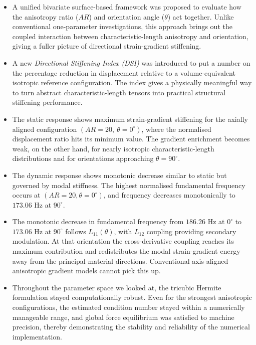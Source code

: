 \documentclass[final,3p,times,fleqn]{elsarticle}
\begin{document}
\begin{itemize}

\item A unified bivariate surface-based framework was proposed to
evaluate how the anisotropy ratio ($AR$) and orientation angle ($\theta$)
act together. Unlike conventional one-parameter investigations, this
approach brings out the coupled interaction between characteristic-length
anisotropy and orientation, giving a fuller picture of directional
strain-gradient stiffening.

\item A new \emph{Directional Stiffening Index (DSI)} was introduced to
put a number on the percentage reduction in displacement relative to a
volume-equivalent isotropic reference configuration. The index gives a
physically meaningful way to turn abstract characteristic-length tensors
into practical structural stiffening performance.

\item The static response shows maximum strain-gradient stiffening for
the axially aligned configuration $(AR = 20,\ \theta = 0^{\circ})$,
where the normalised displacement ratio hits its minimum value. The
gradient enrichment becomes weak, on the other hand, for nearly
isotropic characteristic-length distributions and for orientations
approaching $\theta = 90^{\circ}$.

\item The dynamic response shows monotonic decrease similar to static but governed by modal stiffness. The highest normalised fundamental frequency occurs at $(AR=20,\theta=0^{\circ})$, and frequency decreases monotonically to $173.06$ Hz at $90^{\circ}$.

\item The monotonic decrease in fundamental frequency from $186.26$ Hz at $0^{\circ}$ to $173.06$ Hz at $90^{\circ}$ follows $L_{11}(\theta)$, with $L_{12}$ coupling providing secondary modulation. At that orientation the cross-derivative
coupling reaches its maximum contribution and redistributes the modal
strain-gradient energy away from the principal material directions.
Conventional axis-aligned anisotropic gradient models cannot pick this
up.

\item Throughout the parameter space we looked at, the tricubic Hermite
formulation stayed computationally robust. Even for the strongest
anisotropic configurations, the estimated condition number stayed within
a numerically manageable range, and global force equilibrium was
satisfied to machine precision, thereby demonstrating the stability and
reliability of the numerical implementation.

\end{itemize}
\end{document}
